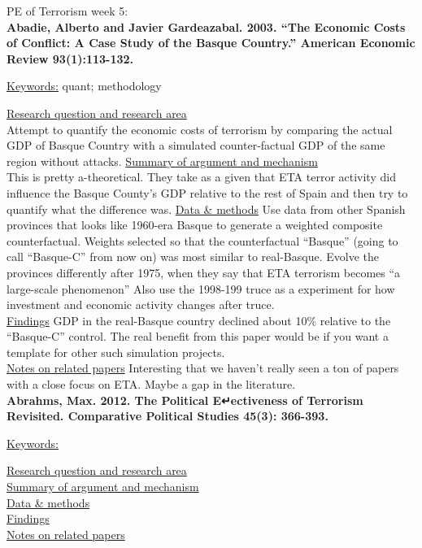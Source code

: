 \documentclass{article}[12pt]
\begin{document}
PE of Terrorism week 5:\\

\textbf{Abadie, Alberto and Javier Gardeazabal. 2003. “The Economic Costs of Conflict: A Case
Study of the Basque Country.” American Economic Review 93(1):113-132.}

\underline{Keywords:} quant; methodology

\underline{Research question and research area} \\ Attempt to quantify the economic costs of terrorism by comparing the actual GDP of Basque Country with a simulated counter-factual GDP of the same region without attacks. 
\underline{Summary of argument and mechanism}\\  This is pretty a-theoretical. They take as a given that ETA terror activity did influence the Basque County's GDP relative to the rest of Spain and then try to quantify what the difference was.
\underline{Data \& methods} Use data from other Spanish provinces that looks like 1960-era Basque to generate a weighted composite counterfactual. Weights selected so that the counterfactual ``Basque'' (going to call ``Basque-C'' from now on) was most similar to real-Basque. Evolve the provinces differently after 1975, when they say that ETA terrorism becomes ``a large-scale phenomenon'' Also use the 1998-199 truce as a experiment for how investment and economic activity changes after truce.\\
\underline{Findings} GDP in the real-Basque country declined about 10\% relative to the ``Basque-C'' control.  The real benefit from this paper would be if you want a template for other such simulation projects.\\
\underline{Notes on related papers} Interesting that we haven't really seen a ton of papers with a close focus on ETA. Maybe a gap in the literature. \\


\textbf{Abrahms, Max. 2012. The Political E↵ectiveness of Terrorism Revisited. Comparative Political
Studies 45(3): 366-393.}


\underline{Keywords:}

\underline{Research question and research area}\\
\underline{Summary of argument and mechanism}\\
\underline{Data \& methods}\\
\underline{Findings}\\
\underline{Notes on related papers}\\
\end{document}
